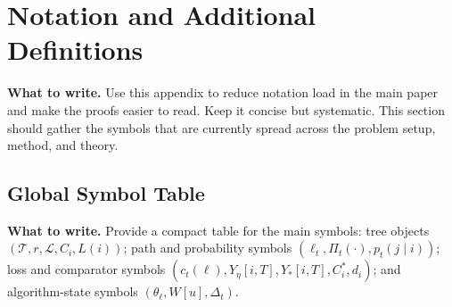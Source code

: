 \documentclass{article}
\newcommand{\towrite}[1]{\noindent\textbf{What to write.} #1}
\begin{document}






\section{Notation and Additional Definitions}

\towrite{Use this appendix to reduce notation load in the main paper and make the proofs easier to read. Keep it concise but systematic. This section should gather the symbols that are currently spread across the problem setup, method, and theory.}

\subsection{Global Symbol Table}

\towrite{Provide a compact table for the main symbols: tree objects $(\mathcal{T}, r, \mathcal{L}, C_i, L(i))$; path and probability symbols $(\ell_t, \Pi_t(\cdot), p_t(j \mid i))$; loss and comparator symbols $(c_t(\ell), Y_\eta[i,T], Y_\ast[i,T], C_i^\ast, d_i)$; and algorithm-state symbols $(\theta_\ell, W[u], \Delta_t)$.}
\end{document}
